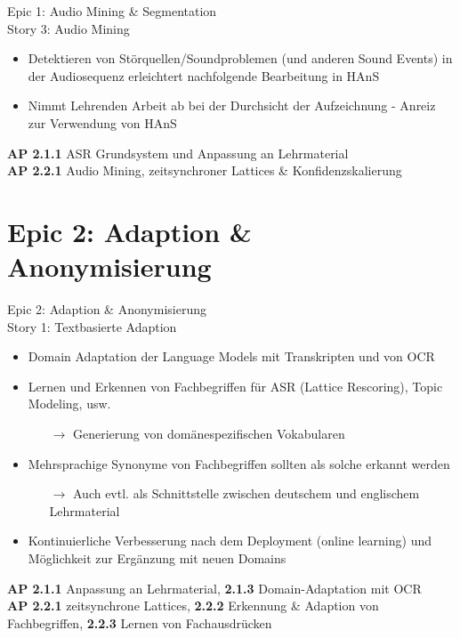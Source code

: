 \documentclass[aspectratio=169,xcolor=dvipsnames]{beamer}
\begin{document}

\begin{frame}{Epic 1: Audio Mining \& Segmentation\\
Story 3: Audio Mining}
    \begin{itemize}
        \item 
        Detektieren von Störquellen/Soundproblemen (und anderen Sound Events) in der Audiosequenz erleichtert nachfolgende Bearbeitung in HAnS
        
        \item
        Nimmt Lehrenden Arbeit ab bei der Durchsicht der Aufzeichnung - Anreiz zur Verwendung von HAnS
        
    \end{itemize}

\vfill    
\scriptsize  \textbf{AP 2.1.1} ASR Grundsystem und Anpassung an Lehrmaterial\\
\textbf{AP 2.2.1} Audio Mining, zeitsynchroner Lattices \& Konfidenzskalierung
\end{frame}

\section{Epic 2: Adaption \& Anonymisierung}

\begin{frame}{Epic 2: Adaption \& Anonymisierung \\ Story 1: Textbasierte Adaption}
    \begin{itemize}
        \item Domain Adaptation der Language Models mit Transkripten und von OCR
        \item Lernen und Erkennen von Fachbegriffen für ASR (Lattice Rescoring), Topic Modeling, usw.\
        \begin{itemize}
            \item[$\rightarrow$] Generierung von domänespezifischen Vokabularen
        \end{itemize}
        \item Mehrsprachige Synonyme von Fachbegriffen sollten als solche erkannt werden
        \begin{itemize}
            \item[$\rightarrow$] Auch evtl. als Schnittstelle zwischen deutschem und englischem Lehrmaterial
        \end{itemize}
        \item Kontinuierliche Verbesserung nach dem Deployment (online learning) und Möglichkeit zur Ergänzung mit neuen Domains
    \end{itemize}

\vfill    
\scriptsize \textbf{AP 2.1.1} Anpassung an Lehrmaterial, \textbf{2.1.3} Domain-Adaptation mit OCR\\
\textbf{AP 2.2.1} zeitsynchrone Lattices, \textbf{2.2.2} Erkennung \& Adaption von Fachbegriffen, \textbf{2.2.3} Lernen von Fachausdrücken    
    
\end{frame}
\end{document}

